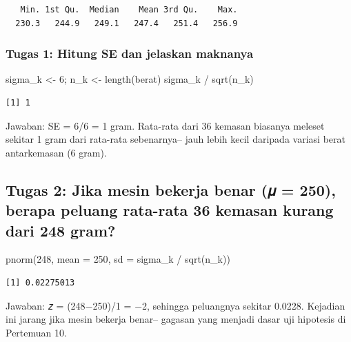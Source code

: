 \documentclass[
  indonesian,
  letterpaper,
]{book}
\newenvironment{Shaded}{\begin{snugshade}}{\end{snugshade}}
\newcommand{\AttributeTok}[1]{\textcolor[rgb]{0.40,0.45,0.13}{#1}}
\newcommand{\DecValTok}[1]{\textcolor[rgb]{0.68,0.00,0.00}{#1}}
\newcommand{\FunctionTok}[1]{\textcolor[rgb]{0.28,0.35,0.67}{#1}}
\newcommand{\NormalTok}[1]{\textcolor[rgb]{0.00,0.23,0.31}{#1}}
\newcommand{\OtherTok}[1]{\textcolor[rgb]{0.00,0.23,0.31}{#1}}
\newcommand{\SpecialCharTok}[1]{\textcolor[rgb]{0.37,0.37,0.37}{#1}}
\begin{document}
\begin{verbatim}
   Min. 1st Qu.  Median    Mean 3rd Qu.    Max. 
  230.3   244.9   249.1   247.4   251.4   256.9 
\end{verbatim}

\subsubsection{Tugas 1: Hitung SE dan jelaskan
maknanya}\label{tugas-1-hitung-se-dan-jelaskan-maknanya}

\begin{Shaded}
\begin{Highlighting}[]
\NormalTok{sigma\_k }\OtherTok{\textless{}{-}} \DecValTok{6}\NormalTok{; n\_k }\OtherTok{\textless{}{-}} \FunctionTok{length}\NormalTok{(berat)}
\NormalTok{sigma\_k }\SpecialCharTok{/} \FunctionTok{sqrt}\NormalTok{(n\_k)}
\end{Highlighting}
\end{Shaded}

\begin{verbatim}
[1] 1
\end{verbatim}

Jawaban: SE = 6/6 = 1 gram. Rata-rata dari 36 kemasan biasanya meleset
sekitar 1 gram dari rata-rata sebenarnya-- jauh lebih kecil daripada
variasi berat antarkemasan (6 gram).

\subsection{Tugas 2: Jika mesin bekerja benar (𝜇 = 250), berapa peluang
rata-rata 36 kemasan kurang dari 248
gram?}\label{tugas-2-jika-mesin-bekerja-benar-ux1d707-250-berapa-peluang-rata-rata-36-kemasan-kurang-dari-248-gram}

\begin{Shaded}
\begin{Highlighting}[]
\FunctionTok{pnorm}\NormalTok{(}\DecValTok{248}\NormalTok{, }\AttributeTok{mean =} \DecValTok{250}\NormalTok{, }\AttributeTok{sd =}\NormalTok{ sigma\_k }\SpecialCharTok{/} \FunctionTok{sqrt}\NormalTok{(n\_k))}
\end{Highlighting}
\end{Shaded}

\begin{verbatim}
[1] 0.02275013
\end{verbatim}

Jawaban: 𝑧 = (248−250)/1 = −2, sehingga peluangnya sekitar 0.0228.
Kejadian ini jarang jika mesin bekerja benar-- gagasan yang menjadi
dasar uji hipotesis di Pertemuan 10.
\end{document}
